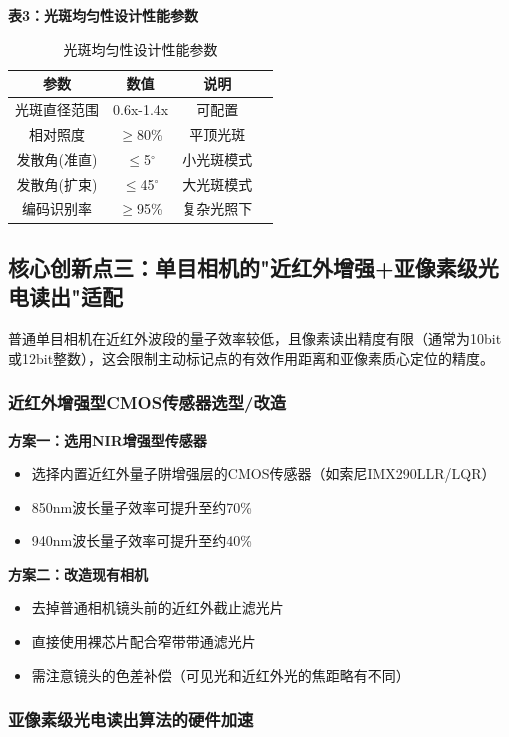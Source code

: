 \documentclass[12pt, a4paper]{ctexart}
\begin{document}
\textbf{表3：光斑均匀性设计性能参数}

\begin{table}[htbp]
\centering
\caption{光斑均匀性设计性能参数}
\begin{tabular}{cccc}
\toprule
参数 & 数值 & 说明 \\
\midrule
光斑直径范围 & 0.6x-1.4x & 可配置 \\
相对照度 & $\ge$80\% & 平顶光斑 \\
发散角(准直) & $\le$5$^\circ$ & 小光斑模式 \\
发散角(扩束) & $\le$45$^\circ$ & 大光斑模式 \\
编码识别率 & $\ge$95\% & 复杂光照下 \\
\bottomrule
\end{tabular}
\end{table}

\subsection{核心创新点三：单目相机的"近红外增强+亚像素级光电读出"适配}

普通单目相机在近红外波段的量子效率较低，且像素读出精度有限（通常为10bit或12bit整数），这会限制主动标记点的有效作用距离和亚像素质心定位的精度。

\subsubsection{近红外增强型CMOS传感器选型/改造}

\textbf{方案一：选用NIR增强型传感器}
\begin{itemize}
\item 选择内置近红外量子阱增强层的CMOS传感器（如索尼IMX290LLR/LQR）
\item 850nm波长量子效率可提升至约70\%
\item 940nm波长量子效率可提升至约40\%
\end{itemize}

\textbf{方案二：改造现有相机}
\begin{itemize}
\item 去掉普通相机镜头前的近红外截止滤光片
\item 直接使用裸芯片配合窄带带通滤光片
\item 需注意镜头的色差补偿（可见光和近红外光的焦距略有不同）
\end{itemize}

\subsubsection{亚像素级光电读出算法的硬件加速}
\end{document}
